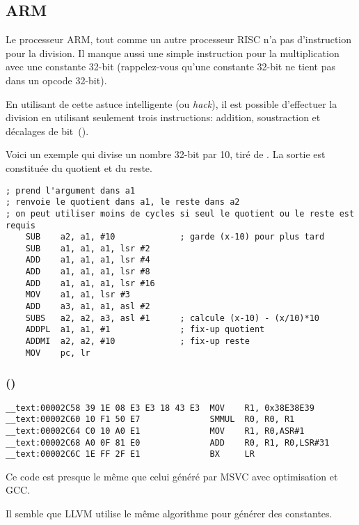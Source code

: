 ﻿\subsection{ARM}

Le processeur ARM, tout comme un autre processeur  RISC n'a pas d'instruction
pour la division.
Il manque aussi une simple instruction pour la multiplication avec une constante 32-bit
(rappelez-vous qu'une constante 32-bit ne tient pas dans un opcode 32-bit).

En utilisant de cette astuce intelligente (ou \emph{hack}), il est possible d'effectuer
la division en utilisant seulement trois instructions: addition, soustraction et
décalages de bit~().

Voici un exemple qui divise un nombre 32-bit par 10, tiré de
.
La sortie est constituée du quotient et du reste.

\begin{lstlisting}[style=customasmARM]
; prend l'argument dans a1
; renvoie le quotient dans a1, le reste dans a2
; on peut utiliser moins de cycles si seul le quotient ou le reste est requis
    SUB    a2, a1, #10             ; garde (x-10) pour plus tard
    SUB    a1, a1, a1, lsr #2
    ADD    a1, a1, a1, lsr #4
    ADD    a1, a1, a1, lsr #8
    ADD    a1, a1, a1, lsr #16
    MOV    a1, a1, lsr #3
    ADD    a3, a1, a1, asl #2
    SUBS   a2, a2, a3, asl #1      ; calcule (x-10) - (x/10)*10
    ADDPL  a1, a1, #1              ; fix-up quotient
    ADDMI  a2, a2, #10             ; fix-up reste
    MOV    pc, lr
\end{lstlisting}

\subsubsection{\OptimizingXcodeIV (\ARMMode)}

\begin{lstlisting}[style=customasmARM]
__text:00002C58 39 1E 08 E3 E3 18 43 E3  MOV    R1, 0x38E38E39
__text:00002C60 10 F1 50 E7              SMMUL  R0, R0, R1
__text:00002C64 C0 10 A0 E1              MOV    R1, R0,ASR#1
__text:00002C68 A0 0F 81 E0              ADD    R0, R1, R0,LSR#31
__text:00002C6C 1E FF 2F E1              BX     LR
\end{lstlisting}

Ce code est presque le même que celui généré par MSVC avec optimisation et GCC.

Il semble que LLVM utilise le même algorithme pour générer des constantes.

